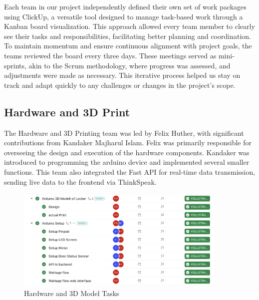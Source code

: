 Each team in our project independently defined their own set of work packages using ClickUp, a versatile tool designed to manage task-based work through a Kanban board visualization. This approach allowed every team member to clearly see their tasks and responsibilities, facilitating better planning and coordination. To maintain momentum and ensure continuous alignment with project goals, the teams reviewed the board every three days. These meetings served as mini-sprints, akin to the Scrum methodology, where progress was assessed, and adjustments were made as necessary. This iterative process helped us stay on track and adapt quickly to any challenges or changes in the project's scope.
\clearpage
\subsection{Hardware and 3D Print}
The Hardware and 3D Printing team was led by Felix Huther, with significant contributions from Kandaker Majharul Islam. Felix was primarily responsible for overseeing the design and execution of the hardware components. Kandaker was introduced to programming the arduino device and implemented several smaller functions. This team also integrated the Fast API for real-time data transmission, sending live data to the frontend via ThinkSpeak.

\begin{figure}[htbp]
    \centering
    \includegraphics[width=0.9\textwidth]{images/hardware and print.png}
    \caption{Hardware and 3D Model Tasks}
    \label{fig:myimage}
\end{figure}

